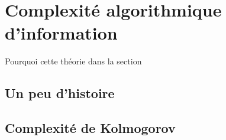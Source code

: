 \chapter{Complexité algorithmique d'information}
Pourquoi cette théorie dans la section 
\section{Un peu d'histoire}
\section{Complexité de Kolmogorov}
\begin{definition}
\end{definition}
